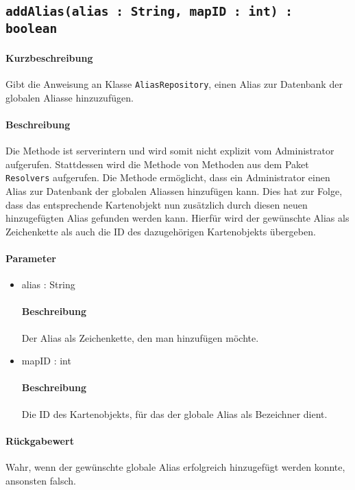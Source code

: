 \subsection{\texttt{addAlias(alias : String, mapID : int) : boolean}}%
\paragraph*{Kurzbeschreibung}
Gibt die Anweisung an Klasse \texttt{AliasRepository}, einen Alias zur Datenbank der globalen Aliasse hinzuzufügen.
\paragraph*{Beschreibung}
Die Methode ist serverintern und wird somit nicht explizit vom Administrator aufgerufen.
Stattdessen wird die Methode von Methoden aus dem Paket \texttt{Resolvers} aufgerufen.
Die Methode ermöglicht, dass ein Administrator einen Alias zur Datenbank der globalen Aliassen hinzufügen kann.
Dies hat zur Folge, dass das entsprechende Kartenobjekt nun zusätzlich durch diesen neuen hinzugefügten Alias gefunden werden kann.
Hierfür wird der gewünschte Alias als Zeichenkette als auch die ID des dazugehörigen Kartenobjekts übergeben.
\paragraph*{Parameter}
\begin{itemize}
    \item alias : String
    		\paragraph*{Beschreibung}
    		Der Alias als Zeichenkette, den man hinzufügen möchte.
    \item mapID : int
    		\paragraph*{Beschreibung}
    		Die ID des Kartenobjekts, für das der globale Alias als Bezeichner dient.
\end{itemize}
\paragraph*{Rückgabewert}
Wahr, wenn der gewünschte globale Alias erfolgreich hinzugefügt werden konnte, ansonsten falsch.
